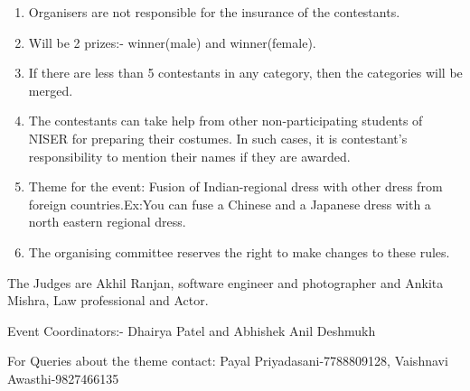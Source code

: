 \documentclass[a4paper, 11pt]{proc}
\begin{document}
\begin{enumerate}
	\item Organisers are not responsible for the insurance of the contestants.
	\item Will be 2 prizes:- winner(male) and winner(female).
	\item If there are less than 5 contestants in any category, then the categories will be merged.
	\item The contestants can take help from other non-participating students of NISER for preparing their costumes. In such cases, it is contestant's responsibility to mention their names if they are awarded.
	\item Theme for the event: Fusion of Indian-regional dress with other dress from foreign countries.Ex:You can fuse a Chinese and a Japanese dress with a north eastern regional dress.
	\item The organising committee reserves the right to make changes to these rules.
\end{enumerate}
The Judges are Akhil Ranjan, software engineer and photographer and Ankita Mishra, Law professional and Actor.

Event Coordinators:- Dhairya Patel and Abhishek Anil Deshmukh

For Queries about the theme contact: Payal Priyadasani-7788809128, Vaishnavi Awasthi-9827466135
\end{document}
